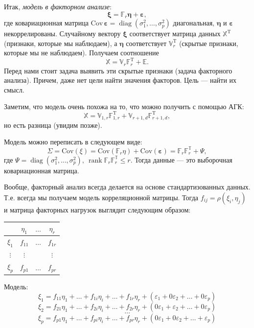 \documentclass[specialist, 12pt,
subf, %
href, colorlinks=true,
substylefile = spbu.rtx,
]{disser}
\DeclareMathOperator{\diag}{diag}
\DeclareMathOperator{\rnk}{rank}
\begin{document}
Итак, \emph{модель в факторном анализе}: $$\bm\xi=\mathbb{F}_r\bm\eta+\bm\varepsilon,$$ где  ковариационная матрица $\text{Cov}\,\bm\varepsilon=\diag(\sigma_1^2,\ldots,\sigma_p^2)$ диагональная, $\bm\eta$ и $\bm\varepsilon$ некоррелированы. Случайному вектору $\bm\xi$ соответствует матрица данных $\mathbb{X}^\mathrm{T}$ (признаки, которые мы наблюдаем), а $\bm\eta$ соответствует $\mathbb{V}_r^\mathrm{T}$ (скрытые признаки, которые мы не наблюдаем). Получаем соотношение $$\mathbb{X}=\mathbb{V}_r\mathbb{F}_r^\mathrm{T}+\mathbb{E}.$$ Перед нами стоит задача выявить эти скрытые признаки (задача факторного анализа). Причем, даже нет цели найти значения факторов. Цель --- найти их смысл.

Заметим, что модель очень похожа на то, что можно получить с помощью АГК:
$$\mathbb{X}=\mathbb{V}_{1,r}\mathbb{F}_{1,r}^\mathrm{T}+\mathbb{V}_{r+1,d}\mathbb{F}_{r+1,d}^\mathrm{T},$$
но есть разница (увидим позже).

Модель можно переписать в следующем виде:
\begin{equation*} \Sigma = \text{Cov}(\xi)=\text{Cov}(\mathbb{F}_r\eta)+\text{Cov}(\bm\varepsilon)=\mathbb{F}_r\mathbb{F}_r^\mathbb{T}+\Psi,
\end{equation*}
где $\Psi=\diag(\sigma_1^2,\ldots,\sigma_p^2), ~\rnk \mathbb{F}_r\mathbb{F}_r^\mathbb{T}\le r. $ Тогда данные --- это выборочная ковариационная матрица.

Вообще, факторный анализ всегда делается на основе стандартизованных данных. Т.е. всегда мы получаем модель корреляционной матрицы. Тогда $f_{ij}=\rho(\xi_i,\eta_j)$ и матрица факторных нагрузок выглядит следующим образом:

\begin{table}[H]
	\centering
	\begin{tabular}{c|ccc}
      &	$\eta_1$ & $\ldots$ & $\eta_r$ \\
		\hline
	$\xi_1$	&      $f_{11}$    &   $\ldots$ & $f_{1r}$             \\
		$\vdots$	&     $\vdots$    &   & $\vdots$            \\
		$\xi_p$	&      $f_{p1}$    &   $\ldots$ & $f_{pr}$             \\
	\end{tabular}
\end{table}

Модель:
\begin{equation*}
\xi_1=f_{11}\eta_1+\ldots+f_{1i}\eta_i+\ldots+f_{1r}\eta_r+(\varepsilon_1+0\varepsilon_2+\ldots+0\varepsilon_p)
\end{equation*}
\begin{equation*}
\xi_2=f_{21}\eta_1+\ldots+f_{2i}\eta_i+\ldots+f_{2r}\eta_r+(0\varepsilon_1+\varepsilon_2 +\ldots+0\varepsilon_p)
\end{equation*}
\begin{equation*}
\ldots
\end{equation*}
\begin{equation*}
\xi_p=f_{p1}\eta_1+\ldots+f_{pi}\eta_i+\ldots+f_{pr}\eta_r+(0\varepsilon_1+0\varepsilon_2+\ldots+\varepsilon_p)
\end{equation*}
\end{document}
